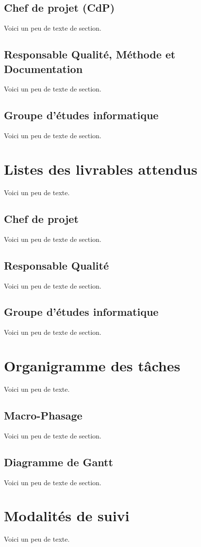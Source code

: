     \section{Chef de projet (CdP)}
    Voici un peu de texte de section.
    \section{Responsable Qualité, Méthode et Documentation}
    Voici un peu de texte de section.
    \section{Groupe d'études informatique}
    Voici un peu de texte de section.
    
    \chapter{Listes des livrables attendus}
    Voici un peu de texte.
    \section{Chef de projet}
    Voici un peu de texte de section.
    \section{Responsable Qualité}
    Voici un peu de texte de section.
    \section{Groupe d'études informatique}
    Voici un peu de texte de section.
    
    \chapter{Organigramme des tâches}
    Voici un peu de texte.
    \section{Macro-Phasage}
    Voici un peu de texte de section.
    \section{Diagramme de Gantt}
    Voici un peu de texte de section.
    
    \chapter{Modalités de suivi}
    Voici un peu de texte.
